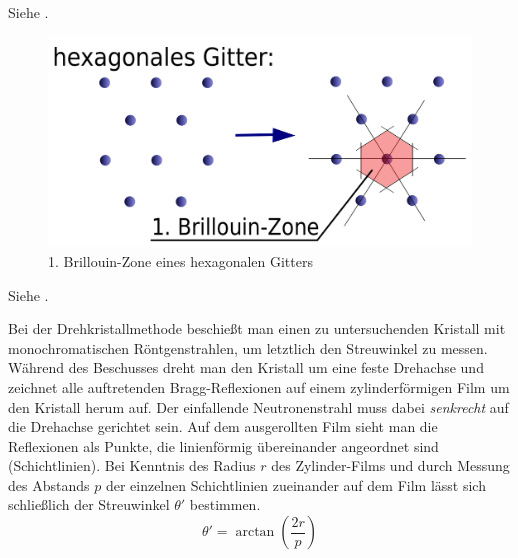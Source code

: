 \label{q:74}

Siehe .

\label{q:75}

\begin{figure}[H]
    \centering
    \begin{samepage}
        \includegraphics[width=0.6\linewidth]{resources/31-10-2013/BZ1_hexagonal.png}
        \caption{1. Brillouin-Zone eines hexagonalen Gitters}
    \end{samepage}
\end{figure}

\label{q:76}

Siehe .

\label{q:77}

Bei der Drehkristallmethode beschießt man einen zu untersuchenden Kristall mit monochromatischen Röntgenstrahlen, um letztlich den Streuwinkel zu messen. Während des Beschusses dreht man den Kristall um eine feste Drehachse und zeichnet alle auftretenden Bragg-Reflexionen auf einem zylinderförmigen Film um den Kristall herum auf. Der einfallende Neutronenstrahl muss dabei \textit{senkrecht} auf die Drehachse gerichtet sein. Auf dem ausgerollten Film sieht man die Reflexionen als Punkte, die linienförmig übereinander angeordnet sind (Schichtlinien). Bei Kenntnis des Radius $r$ des Zylinder-Films und durch Messung des Abstands $p$ der einzelnen Schichtlinien zueinander auf dem Film lässt sich schließlich der Streuwinkel $\theta'$ bestimmen.
\begin{equation}
    \label{eq:drehkristallmethode}
    \theta' = \arctan\left(\frac{2r}{p}\right)
\end{equation}

\label{q:78}

